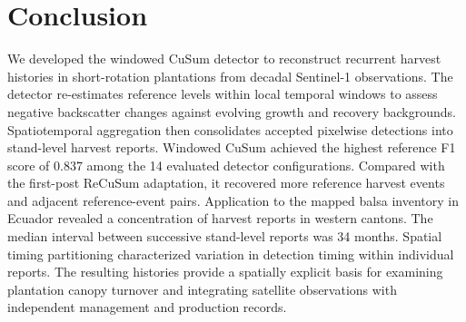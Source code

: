 \section{Conclusion}
\label{sec:conclusion}

We developed the windowed CuSum detector to reconstruct recurrent harvest histories in short-rotation plantations from decadal Sentinel-1 observations. The detector re-estimates reference levels within local temporal windows to assess negative backscatter changes against evolving growth and recovery backgrounds. Spatiotemporal aggregation then consolidates accepted pixelwise detections into stand-level harvest reports. Windowed CuSum achieved the highest reference F1 score of 0.837 among the 14 evaluated detector configurations. Compared with the first-post ReCuSum adaptation, it recovered more reference harvest events and adjacent reference-event pairs. Application to the mapped balsa inventory in Ecuador revealed a concentration of harvest reports in western cantons. The median interval between successive stand-level reports was 34 months. Spatial timing partitioning characterized variation in detection timing within individual reports. The resulting histories provide a spatially explicit basis for examining plantation canopy turnover and integrating satellite observations with independent management and production records.
